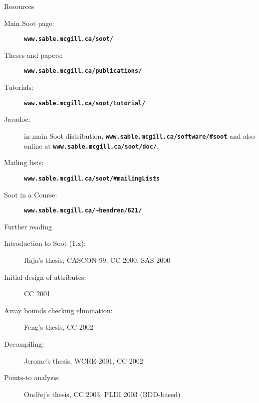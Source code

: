 \begin{slide}{Resources}
\begin{small}
\begin{description}
\item[Main Soot page:] \textbf{\texttt{www.sable.mcgill.ca/soot/}}
\item[Theses and papers:] \textbf{\texttt{www.sable.mcgill.ca/publications/}}
\item[Tutorials:] \textbf{\texttt{www.sable.mcgill.ca/soot/tutorial/}}
\item[Javadoc:] in main Soot distribution, 
\textbf{\texttt{www.sable.mcgill.ca/software/\#soot}}
and also online at \textbf{\texttt{www.sable.mcgill.ca/soot/doc/}}.
\item[Mailing lists:] \textbf{\texttt{www.sable.mcgill.ca/soot/\#mailingLists}}
\item[Soot in a Course:] \textbf{\texttt{www.sable.mcgill.ca/\~{}hendren/621/}}
\end{description}
\end{small}
\end{slide}

\begin{slide}{Further reading}
\begin{description}
\item [Introduction to Soot (1.x):]  
Raja's thesis, CASCON 99, CC 2000, SAS 2000
\item [Initial design of attributes:] CC 2001
\item [Array bounds checking elimination:] Feng's thesis, CC 2002
\item [Decompiling:] Jerome's thesis, WCRE 2001, CC 2002
\item [Points-to analysis:] Ond\v{r}ej's thesis, CC 2003, PLDI 2003 (BDD-based)
\end{description}
\end{slide}
